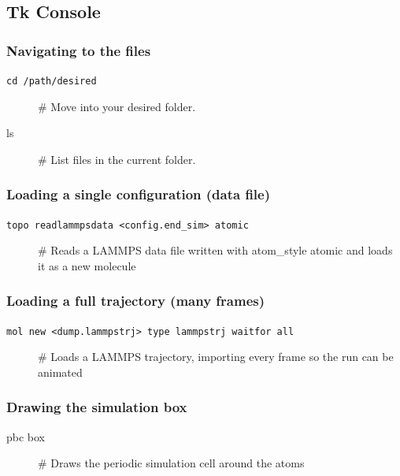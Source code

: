 \documentclass{article}
\begin{document}
\subsection{Tk Console}
\subsubsection{Navigating to the files}
\begin{description}
    \item[\texttt{cd /path/desired}] \# Move into your desired folder.
    \item[ls] \# List files in the current folder.
\end{description}

\subsubsection{Loading a single configuration (data file)}
\begin{description}
    \item[\texttt{topo readlammpsdata <config.end\_sim> atomic}] \# Reads a LAMMPS data file written with atom\_style atomic and loads it as a new molecule
\end{description}

\subsubsection{Loading a full trajectory (many frames)}
\begin{description}
    \item[\texttt{mol new <dump.lammpstrj> type lammpstrj waitfor all}] \# Loads a LAMMPS trajectory, importing every frame so the run can be animated
\end{description}

\subsubsection{Drawing the simulation box}
\begin{description}
    \item[pbc box] \# Draws the periodic simulation cell around the atoms
\end{description}
\end{document}
